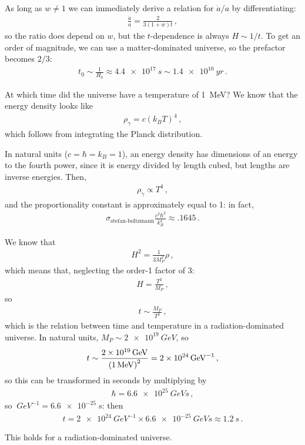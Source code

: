 \documentclass[main.tex]{subfiles}
\begin{document}
As long as \(w \neq 1\) we can immediately derive a relation for \(\dot{a} / a \) by differentiating: 
%
\begin{align}
\frac{\dot{a}}{a} = \frac{2 }{3 (1+w) t}
\,,
\end{align}
%
so the ratio does depend on \(w\), but the \(t\)-dependence is always \(H \sim 1/t\). To get an order of magnitude, we can use a matter-dominated universe, so the prefactor becomes \(2/3\): 
%
\begin{align}
t_0 \sim \frac{1}{H_0} \approx  \SI{4.4e17}{s} \sim \SI{1.4e10}{yr}
\,.
\end{align}
%

At which time did the universe have a temperature of \SI{1 }{MeV}? We know that the energy density looks like 
%
\begin{align}
\rho_{\gamma } = c (k_B T)^{4}
\,,
\end{align}
%
which follows from integrating the Planck distribution. 

In natural units (\(c = \hbar = k_B =1\)), an energy density has dimensions of an energy to the fourth power, since it is energy divided by length cubed, but lengths are inverse energies. Then, 
%
\begin{align}
\rho_{\gamma } \propto T^{4}
\,,
\end{align}
and the proportionality constant is approximately equal to 1: in fact, 
%
\begin{align}
\sigma_{\text{stefan-boltzmann}} \frac{c^2 \hbar^3}{k_B^{4}}\approx \num{.1645}
\,.
\end{align}

We know that 
%
\begin{align}
H^2 = \frac{1}{3 M_P^2} \rho 
\,,
\end{align}
%
which  means that, neglecting the order-1 factor of 3:
%
\begin{align}
H = \frac{T^2}{M_P}
\,,
\end{align}
%
so 
%
\begin{align}
t \sim \frac{M_P}{T^2}
\,,
\end{align}
%
which is the relation between time and temperature in a radiation-dominated universe. In natural units, \(M_P \sim \SI{2e19 }{GeV}\), so 
%
\begin{align}
t \sim \frac{\SI{2e19}{GeV}}{\qty(\SI{1}{MeV})^2} = \SI{2e24}{GeV^{-1}}
\,,
\end{align}
%
so this can be transformed in seconds by multiplying by 
%
\begin{align}
\hbar = \SI{6.6e25}{GeV s}
\,,
\end{align}
%
so \(\SI{}{GeV^{-1}} = \SI{6.6e-25}{s}\): then 
%
\begin{align}
t  = \SI{2e24}{GeV^{-1}} \times \SI{6.6e-25}{GeV s} \approx \SI{1.2}{s}
\,.
\end{align}

This holds for a radiation-dominated universe. 
\end{document}
